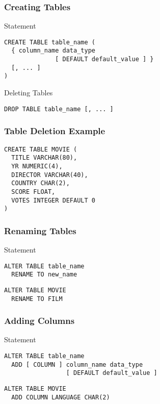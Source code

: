\documentclass[dvipsnames]{beamer}
\theoremstyle{plain}
\begin{document}
\begin{frame}[fragile]
  \frametitle{Creating Tables}

  \begin{block}{Statement}
    \begin{lstlisting}
CREATE TABLE table_name (
  { column_name data_type
              [ DEFAULT default_value ] }
  [, ... ]
)
    \end{lstlisting}
  \end{block}

  \pause
  \begin{block}{Deleting Tables}
    \begin{lstlisting}
DROP TABLE table_name [, ... ]
    \end{lstlisting}
  \end{block}
\end{frame}

\begin{frame}[fragile]
  \frametitle{Table Deletion Example}

  \begin{example}
    \begin{lstlisting}
CREATE TABLE MOVIE (
  TITLE VARCHAR(80),
  YR NUMERIC(4),
  DIRECTOR VARCHAR(40),
  COUNTRY CHAR(2),
  SCORE FLOAT,
  VOTES INTEGER DEFAULT 0
)
    \end{lstlisting}
  \end{example}
\end{frame}

\begin{frame}[fragile]
  \frametitle{Renaming Tables}

  \begin{block}{Statement}
    \begin{lstlisting}
ALTER TABLE table_name
  RENAME TO new_name
    \end{lstlisting}
  \end{block}

  \pause
  \begin{example}
    \begin{lstlisting}
ALTER TABLE MOVIE
  RENAME TO FILM
    \end{lstlisting}
  \end{example}
\end{frame}

\begin{frame}[fragile]
  \frametitle{Adding Columns}

  \begin{block}{Statement}
    \begin{lstlisting}
ALTER TABLE table_name
  ADD [ COLUMN ] column_name data_type
                 [ DEFAULT default_value ]
    \end{lstlisting}
  \end{block}

  \pause
  \begin{example}
    \begin{lstlisting}
ALTER TABLE MOVIE
  ADD COLUMN LANGUAGE CHAR(2)
    \end{lstlisting}
  \end{example}
\end{frame}
\end{document}
